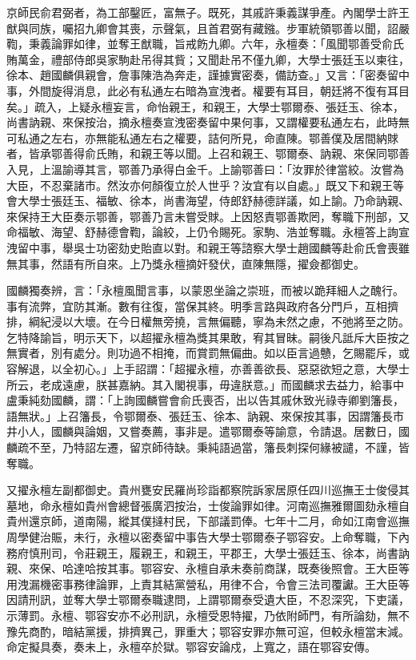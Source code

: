 \begin{pinyinscope}
京師民俞君弼者，為工部鑿匠，富無子。既死，其戚許秉義謀爭產。內閣學士許王猷與同族，囑招九卿會其喪，示聲氣，且首君弼有藏鏹。步軍統領鄂善以聞，詔嚴鞫，秉義論罪如律，並奪王猷職，旨戒飭九卿。六年，永檀奏：「風聞鄂善受俞氏賄萬金，禮部侍郎吳家駒赴吊得其貲；又聞赴吊不僅九卿，大學士張廷玉以柬往，徐本、趙國麟俱親會，詹事陳浩為奔走，謹據實密奏，備訪查。」又言：「密奏留中事，外間旋得消息，此必有私通左右暗為宣洩者。權要有耳目，朝廷將不復有耳目矣。」疏入，上疑永檀妄言，命怡親王，和親王，大學士鄂爾泰、張廷玉、徐本，尚書訥親、來保按治，摘永檀奏宣洩密奏留中果何事，又謂權要私通左右，此時無可私通之左右，亦無能私通左右之權要，詰何所見，命直陳。鄂善僕及居間納賕者，皆承鄂善得俞氏賄，和親王等以聞。上召和親王、鄂爾泰、訥親、來保同鄂善入見，上溫諭導其言，鄂善乃承得白金千。上諭鄂善曰：「汝罪於律當絞。汝嘗為大臣，不忍棄諸市。然汝亦何顏復立於人世乎？汝宜有以自處。」既又下和親王等會大學士張廷玉、福敏、徐本，尚書海望，侍郎舒赫德詳議，如上諭。乃命訥親、來保持王大臣奏示鄂善，鄂善乃言未嘗受賕。上因怒責鄂善欺罔，奪職下刑部，又命福敏、海望、舒赫德會鞫，論絞，上仍令賜死。家駒、浩並奪職。永檀答上詢宣洩留中事，舉吳士功密劾史貽直以對。和親王等諮察大學士趙國麟等赴俞氏會喪雖無其事，然語有所自來。上乃獎永檀摘奸發伏，直陳無隱，擢僉都御史。

國麟獨奏辨，言：「永檀風聞言事，以蒙恩坐論之崇班，而被以跪拜細人之醜行。事有流弊，宜防其漸。數有往復，當保其終。明季言路與政府各分門戶，互相擠排，綱紀浸以大壞。在今日權無旁撓，言無偏聽，寧為未然之慮，不弛將至之防。乞特降諭旨，明示天下，以超擢永檀為獎其果敢，宥其冒昧。嗣後凡詆斥大臣按之無實者，別有處分。則功過不相掩，而賞罰無偏曲。如以臣言過戇，乞賜罷斥，或容解退，以全初心。」上手詔謂：「超擢永檀，亦善善欲長、惡惡欲短之意，大學士所云，老成遠慮，朕甚嘉納。其入閣視事，毋違朕意。」而國麟求去益力，給事中盧秉純劾國麟，謂：「上詢國麟嘗會俞氏喪否，出以告其戚休致光祿寺卿劉籓長，語無狀。」上召籓長，令鄂爾泰、張廷玉、徐本、訥親、來保按其事，因謂籓長市井小人，國麟與論姻，又嘗奏薦，事非是。遣鄂爾泰等諭意，令請退。居數日，國麟疏不至，乃特詔左遷，留京師待缺。秉純語過當，籓長刺探何緣被譴，不謹，皆奪職。

又擢永檀左副都御史。貴州甕安民羅尚珍詣都察院訴家居原任四川巡撫王士俊侵其墓地，命永檀如貴州會總督張廣泗按治，士俊論罪如律。河南巡撫雅爾圖劾永檀自貴州還京師，道南陽，縱其僕撻村民，下部議罰俸。七年十二月，命如江南會巡撫周學健治賑，未行，永檀以密奏留中事告大學士鄂爾泰子鄂容安。上命奪職，下內務府慎刑司，令莊親王，履親王，和親王，平郡王，大學士張廷玉、徐本，尚書訥親、來保、哈達哈按其事。鄂容安、永檀自承未奏前商謀，既奏後照會。王大臣等用洩漏機密事務律論罪，上責其結黨營私，用律不合，令會三法司覆讞。王大臣等因請刑訊，並奪大學士鄂爾泰職逮問，上謂鄂爾泰受遺大臣，不忍深究，下吏議，示薄罰。永檀、鄂容安亦不必刑訊，永檀受恩特擢，乃依附師門，有所論劾，無不豫先商酌，暗結黨援，排擠異己，罪重大；鄂容安罪亦無可逭，但較永檀當末減。命定擬具奏，奏未上，永檀卒於獄。鄂容安論戍，上寬之，語在鄂容安傳。


\end{pinyinscope}
